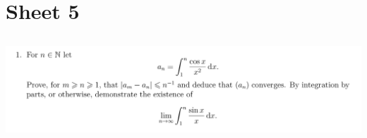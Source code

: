 \documentclass[12pt]{article}
\begin{document}
\section{Sheet 5}

\newpage
\subsection{}

\begin{mdframed}
\includegraphics[width=400pt]{img/analysis--oxford-M2-I-5-1.png}
\end{mdframed}
\end{document}
